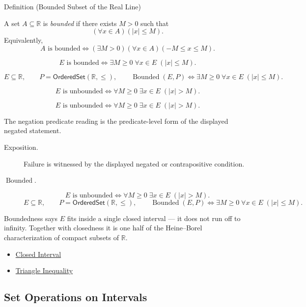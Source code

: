 \begin{definitionbox}{Definition (Bounded Subset of the Real Line)}
\begin{definition}
\label{def:bounded-subset-of-r}
A set $A\subseteq\mathbb{R}$ is \emph{bounded} if there exists $M>0$ such that
\[
  (\forall x\in A)(|x|\leq M).
\]
Equivalently,
\[
  A\text{ is bounded}
  \Longleftrightarrow
  (\exists M>0)(\forall x\in A)(-M\leq x\leq M).
\]
\end{definition}
\end{definitionbox}
\begin{remark*}
\[
E \text{ is bounded} \Longleftrightarrow \exists M\ge 0\;\forall x\in E\;(|x|\le M).
\]
\end{remark*}
\begin{remark*}
\[
E\subseteq\mathbb{R},\qquad P=\mathsf{OrderedSet}(\mathbb{R},\leq),\qquad
\operatorname{Bounded}(E,P)
\Longleftrightarrow
\exists M\ge 0\;\forall x\in E\;(|x|\le M).
\]
\end{remark*}
\begin{remark*}
\[
E \text{ is unbounded} \Longleftrightarrow \forall M\ge 0\;\exists x\in E\;(|x|>M).
\]
\end{remark*}

\begin{remark*}
\[
E \text{ is unbounded} \Longleftrightarrow \forall M\ge 0\;\exists x\in E\;(|x|>M).
\]

The negation predicate reading is the predicate-level form of the displayed negated statement.
\end{remark*}

\begin{remark*}
\begin{description}
  \item[Exposition.]
  Failure is witnessed by the displayed negated or contrapositive condition.

  \item[\(\operatorname{Bounded}.\)]
  \[
E \text{ is unbounded} \Longleftrightarrow \forall M\ge 0\;\exists x\in E\;(|x|>M).
\]
\[
E\subseteq\mathbb{R},\qquad P=\mathsf{OrderedSet}(\mathbb{R},\leq),\qquad
\operatorname{Bounded}(E,P)
\Longleftrightarrow
\exists M\ge 0\;\forall x\in E\;(|x|\le M).
\]
\end{description}
\end{remark*}
\begin{remark*}[Interpretation]
Boundedness says $E$ fits inside a single closed interval --- it does not run off to infinity. Together with closedness it is one half of the Heine--Borel characterization of compact subsets of $\mathbb{R}$.
\end{remark*}
\begin{dependencies}
\begin{itemize}
  \item \hyperref[def:closed-interval]{Closed Interval}
  \item \hyperref[thm:triangle-inequality]{Triangle Inequality}
\end{itemize}
\end{dependencies}

\subsection*{Set Operations on Intervals}
\label{subsec:set-operations-on-intervals}
